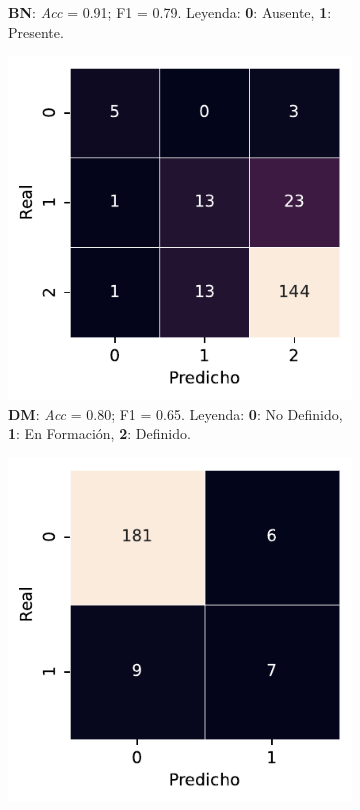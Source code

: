 \begin{figure}[htbp]
\begin{subfigure}[t]{0.3\textwidth}
        \caption{\textbf{BN}: \textit{Acc} = 0.91; F1 = 0.79. Leyenda: \textbf{0}: Ausente, \textbf{1}: Presente.}
        \label{fig5:BN_confusion_matrix}
    \end{subfigure} 
    \begin{subfigure}[t]{0.3\textwidth}
        \includegraphics[width=\textwidth]{figures/5_experiments/multi-dm-cm.pdf}
        \caption{\textbf{DM}: \textit{Acc} = 0.80; F1 = 0.65. Leyenda: \textbf{0}: No Definido, \textbf{1}: En Formación, \textbf{2}: Definido.}
        \label{fig5:DM_confusion_matrix}
    \end{subfigure}
    \begin{subfigure}[t]{0.3\textwidth}
        \includegraphics[width=\textwidth]{figures/5_experiments/multi-dp-cm.pdf}

\end{subfigure}
\end{figure}
